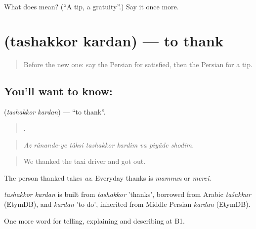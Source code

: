 \begin{tcolorbox}[breakable,colback=teal!4,colframe=teal!35!black,title={Before you move on}]
What does  mean? (\textquotedblleft{}A tip, a gratuity\textquotedblright{}.) Say it once more.
\end{tcolorbox}
\section[\texorpdfstring{\fa{تشکر} \fa{کردن} (tashakkor kardan)}{تشکر کردن (tashakkor kardan)}]{  (tashakkor kardan) — to thank}

\label{lesson:FA-C443-tashakkor-kardan}



\begin{quote}
Before the new one: say the Persian for satisfied, then the Persian for a tip.
\end{quote}

\subsection*{You'll want to know:  }
\textbf{ } (\emph{tashakkor kardan}) — \textquotedblleft{}to thank\textquotedblright{}.

\begin{quote}
       .
\end{quote}

\begin{quote}
\emph{Az rânande-ye tâksi tashakkor kardim va piyâde shodim.}
\end{quote}

\begin{quote}
We thanked the taxi driver and got out.
\end{quote}

The person thanked takes \emph{az}. Everyday thanks is \emph{mamnun} or \emph{merci}.

\begin{cousinweb}
\emph{tashakkor kardan} is built from \emph{tashakkor} 'thanks', borrowed from Arabic \emph{tašakkur} (EtymDB), and \emph{kardan} 'to do', inherited from Middle Persian \emph{kardan} (EtymDB).
\end{cousinweb}

\begin{grammarlens}[title={What you've built}]
One more word for telling, explaining and describing at B1.
\end{grammarlens}


